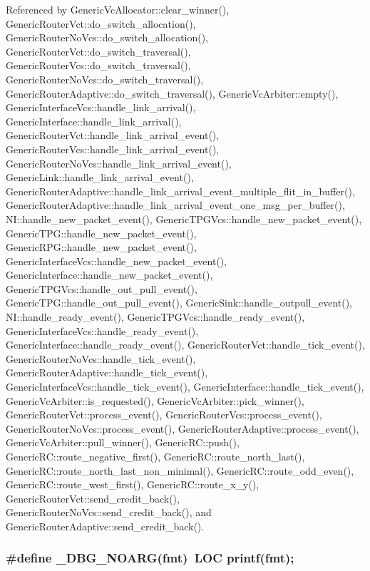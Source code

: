 Referenced by GenericVcAllocator::clear\_\-winner(), GenericRouterVct::do\_\-switch\_\-allocation(), GenericRouterNoVcs::do\_\-switch\_\-allocation(), GenericRouterVct::do\_\-switch\_\-traversal(), GenericRouterVcs::do\_\-switch\_\-traversal(), GenericRouterNoVcs::do\_\-switch\_\-traversal(), GenericRouterAdaptive::do\_\-switch\_\-traversal(), GenericVcArbiter::empty(), GenericInterfaceVcs::handle\_\-link\_\-arrival(), GenericInterface::handle\_\-link\_\-arrival(), GenericRouterVct::handle\_\-link\_\-arrival\_\-event(), GenericRouterVcs::handle\_\-link\_\-arrival\_\-event(), GenericRouterNoVcs::handle\_\-link\_\-arrival\_\-event(), GenericLink::handle\_\-link\_\-arrival\_\-event(), GenericRouterAdaptive::handle\_\-link\_\-arrival\_\-event\_\-multiple\_\-flit\_\-in\_\-buffer(), GenericRouterAdaptive::handle\_\-link\_\-arrival\_\-event\_\-one\_\-msg\_\-per\_\-buffer(), NI::handle\_\-new\_\-packet\_\-event(), GenericTPGVcs::handle\_\-new\_\-packet\_\-event(), GenericTPG::handle\_\-new\_\-packet\_\-event(), GenericRPG::handle\_\-new\_\-packet\_\-event(), GenericInterfaceVcs::handle\_\-new\_\-packet\_\-event(), GenericInterface::handle\_\-new\_\-packet\_\-event(), GenericTPGVcs::handle\_\-out\_\-pull\_\-event(), GenericTPG::handle\_\-out\_\-pull\_\-event(), GenericSink::handle\_\-outpull\_\-event(), NI::handle\_\-ready\_\-event(), GenericTPGVcs::handle\_\-ready\_\-event(), GenericInterfaceVcs::handle\_\-ready\_\-event(), GenericInterface::handle\_\-ready\_\-event(), GenericRouterVct::handle\_\-tick\_\-event(), GenericRouterNoVcs::handle\_\-tick\_\-event(), GenericRouterAdaptive::handle\_\-tick\_\-event(), GenericInterfaceVcs::handle\_\-tick\_\-event(), GenericInterface::handle\_\-tick\_\-event(), GenericVcArbiter::is\_\-requested(), GenericVcArbiter::pick\_\-winner(), GenericRouterVct::process\_\-event(), GenericRouterVcs::process\_\-event(), GenericRouterNoVcs::process\_\-event(), GenericRouterAdaptive::process\_\-event(), GenericVcArbiter::pull\_\-winner(), GenericRC::push(), GenericRC::route\_\-negative\_\-first(), GenericRC::route\_\-north\_\-last(), GenericRC::route\_\-north\_\-last\_\-non\_\-minimal(), GenericRC::route\_\-odd\_\-even(), GenericRC::route\_\-west\_\-first(), GenericRC::route\_\-x\_\-y(), GenericRouterVct::send\_\-credit\_\-back(), GenericRouterNoVcs::send\_\-credit\_\-back(), and GenericRouterAdaptive::send\_\-credit\_\-back().
\subsubsection[{\_\-DBG\_\-NOARG}]{\setlength{\rightskip}{0pt plus 5cm}\#define \_\-DBG\_\-NOARG(fmt)~LOC printf(fmt);}\label{simIrisComponentHeader_8h_34e0f121e3b717b1a15c6f90dae9f5d5}




